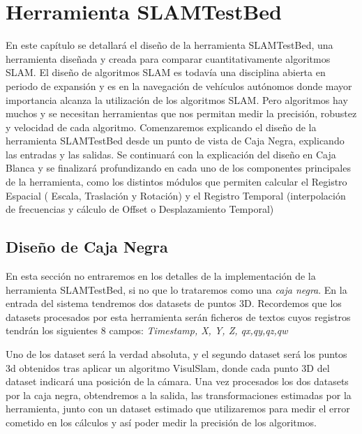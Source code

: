 \newpage
\chapter{Herramienta SLAMTestBed} \label{cap:Herramienta SLAMTestBed} %
En este capítulo se detallará el diseño de la herramienta SLAMTestBed, una herramienta diseñada y creada para comparar cuantitativamente algoritmos SLAM. El diseño de algoritmos SLAM es todavía una disciplina abierta en periodo de expansión y es en la navegación de vehículos autónomos donde mayor importancia alcanza la utilización de los algoritmos SLAM. Pero algoritmos hay muchos y se necesitan herramientas que nos permitan medir la precisión, robustez y velocidad de cada algoritmo.
Comenzaremos explicando el diseño de la herramienta SLAMTestBed desde un punto de vista de Caja Negra, explicando las entradas y las salidas. Se continuará con la explicación del diseño en Caja Blanca y se finalizará profundizando en cada uno de los componentes principales de la herramienta, como los distintos módulos que permiten calcular el Registro Espacial ( Escala, Traslación y Rotación) y el Registro Temporal (interpolación de frecuencias y cálculo de Offset o Desplazamiento Temporal)

\section{Diseño de Caja Negra}

En esta sección no entraremos en los detalles de la implementación de la herramienta SLAMTestBed, si no que lo trataremos como una \textit{caja negra}.
En la entrada del sistema tendremos dos datasets de puntos 3D.
Recordemos que los datasets procesados por esta herramienta serán ficheros de textos cuyos registros tendrán los siguientes 8 campos:
\textit{Timestamp, X, Y, Z, qx,qy,qz,qw}

Uno de los dataset será la verdad absoluta, y el segundo dataset será los puntos 3d obtenidos tras aplicar un algoritmo VisulSlam, donde cada punto 3D del dataset indicará una posición de la cámara.
Una vez procesados los dos datasets por la caja negra, obtendremos a la salida, las transformaciones estimadas por la herramienta, junto con un dataset estimado que utilizaremos para medir el error cometido en los cálculos y así poder medir la precisión de los algoritmos.


